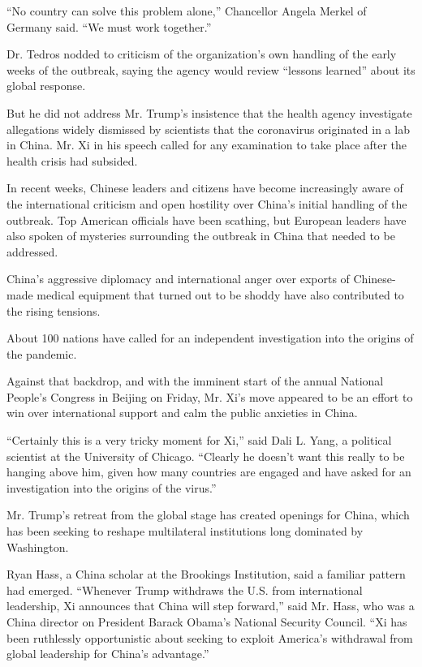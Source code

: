 ``No country can solve this problem alone,'' Chancellor Angela Merkel of
Germany said. ``We must work together.''

Dr. Tedros nodded to criticism of the organization's own handling of the
early weeks of the outbreak, saying the agency would review ``lessons
learned'' about its global response.

But he did not address Mr. Trump's insistence that the health agency
investigate allegations widely dismissed by scientists that the
coronavirus originated in a lab in China. Mr. Xi in his speech called
for any examination to take place after the health crisis had subsided.

In recent weeks, Chinese leaders and citizens have become increasingly
aware of the international criticism and open hostility over China's
initial handling of the outbreak. Top American officials have been
scathing, but European leaders have also spoken of mysteries surrounding
the outbreak in China that needed to be addressed.

China's aggressive diplomacy and international anger over exports of
Chinese-made medical equipment that turned out to be shoddy have also
contributed to the rising tensions.

About 100 nations have called for an independent investigation into the
origins of the pandemic.

Against that backdrop, and with the imminent start of the annual
National People's Congress in Beijing on Friday, Mr. Xi's move appeared
to be an effort to win over international support and calm the public
anxieties in China.

``Certainly this is a very tricky moment for Xi,'' said Dali L. Yang, a
political scientist at the University of Chicago. ``Clearly he doesn't
want this really to be hanging above him, given how many countries are
engaged and have asked for an investigation into the origins of the
virus.''

Mr. Trump's retreat from the global stage has created openings for
China, which has been seeking to reshape multilateral institutions long
dominated by Washington.

Ryan Hass, a China scholar at the Brookings Institution, said a familiar
pattern had emerged. ``Whenever Trump withdraws the U.S. from
international leadership, Xi announces that China will step forward,''
said Mr. Hass, who was a China director on President Barack Obama's
National Security Council. ``Xi has been ruthlessly opportunistic about
seeking to exploit America's withdrawal from global leadership for
China's advantage.''

